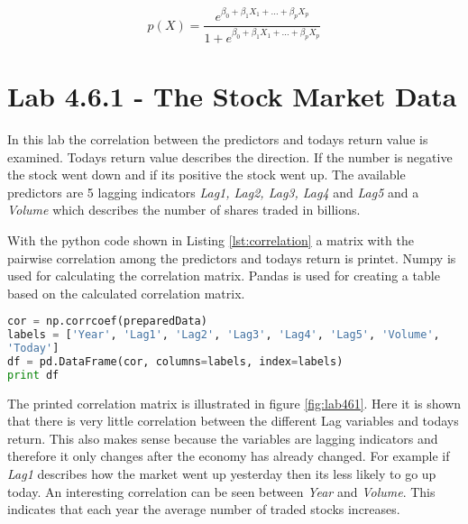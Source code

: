 
\begin{equation}
	p(X) = \dfrac{e^{\beta_0 + \beta_1 X_1 + ... + \beta_p X_p}}{1 + e^{\beta_0 + \beta_1 X_1 + ... + \beta_p X_p}}
\end{equation}


\section{Lab 4.6.1 - The Stock Market Data}
In this lab the correlation between the predictors and todays return value is examined. Todays return value describes the direction. If the number is negative the stock went down and if its positive the stock went up. The available predictors are 5 lagging indicators \emph{Lag1, Lag2, Lag3, Lag4} and \emph{Lag5} and a \emph{Volume} which describes the number of shares traded in billions.

With the python code shown in Listing \ref{lst:correlation} a matrix with the pairwise correlation among the predictors and todays return is printet. Numpy is used for calculating the correlation matrix. Pandas is used for creating a table based on the calculated correlation matrix.

\begin{lstlisting}[language=Python, label=lst:correlation, caption=Print correlation matrix]
cor = np.corrcoef(preparedData)
labels = ['Year', 'Lag1', 'Lag2', 'Lag3', 'Lag4', 'Lag5', 'Volume', 
'Today']
df = pd.DataFrame(cor, columns=labels, index=labels)
print df
\end{lstlisting}

The printed correlation matrix is illustrated in figure \ref{fig:lab461}. Here it is shown that there is very little correlation between the different Lag variables and todays return. This also makes sense because the variables are lagging indicators and therefore it only changes after the economy has already changed. For example if \emph{Lag1} describes how the market went up yesterday then its less likely to go up today. An interesting correlation can be seen between \emph{Year} and \emph{Volume}. This indicates that each year the average number of traded stocks increases. 

